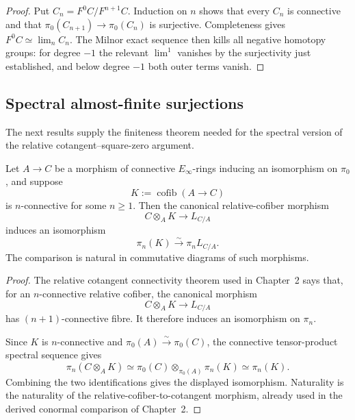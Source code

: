 \begin{proof}
Put $C_n=F^0C/F^{n+1}C$.  Induction on $n$ shows that every $C_n$ is
connective and that
$\pi_0(C_{n+1})\to\pi_0(C_n)$ is surjective.  Completeness gives
$F^0C\simeq\lim_nC_n$.  The Milnor exact sequence then kills all negative
homotopy groups: for degree $-1$ the relevant $\lim^1$ vanishes by the
surjectivity just established, and below degree $-1$ both outer terms vanish.
\end{proof}

\subsection{Spectral almost-finite surjections}

The next results supply the finiteness theorem needed for the spectral
version of the relative cotangent--square-zero argument.

\begin{lemma}
\label{lem:bnla-relative-spectral-hurewicz}
Let $A\to C$ be a morphism of connective $E_\infty$-rings inducing an
isomorphism on $\pi_0$, and suppose
\[
    K:=\operatorname{cofib}(A\to C)
\]
is $n$-connective for some $n\geq1$.  Then the canonical relative-cofiber
morphism
\[
    C\otimes_A K
    \longrightarrow
    L_{C/A}
\]
induces an isomorphism
\[
    \boxed{
    \pi_n(K)\xrightarrow{\sim}\pi_nL_{C/A}.}
\]
The comparison is natural in commutative diagrams of such morphisms.
\end{lemma}

\begin{proof}
The relative cotangent connectivity theorem used in Chapter~2 says that, for
an $n$-connective relative cofiber, the canonical morphism
\[
    C\otimes_AK\longrightarrow L_{C/A}
\]
has $(n+1)$-connective fibre.  It therefore induces an isomorphism on
$\pi_n$.

Since $K$ is $n$-connective and
$\pi_0(A)\xrightarrow{\sim}\pi_0(C)$, the connective tensor-product spectral
sequence gives
\[
    \pi_n(C\otimes_AK)
    \simeq
    \pi_0(C)\otimes_{\pi_0(A)}\pi_n(K)
    \simeq
    \pi_n(K).
\]
Combining the two identifications gives the displayed isomorphism.
Naturality is the naturality of the relative-cofiber-to-cotangent morphism,
already used in the derived conormal comparison of Chapter~2.
\end{proof}

